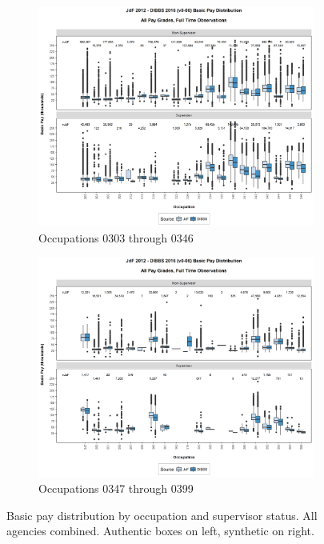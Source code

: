 \documentclass[10pt, letterpaper]{article}
\begin{document}
\begin{spacing}{1.0}
\clearpage

\begin{figure}[h]
    \centering
    \begin{subfigure}{1\textwidth}
        \centering
        \includegraphics[width=6in, trim={0 1in 0 0.75in}, clip]{JdFDIBBSBasicPaySupervisoryStatusOccupation81.png}
        \caption{Occupations 0303 through 0346}
        \vspace{10pt}
    \end{subfigure}
    \begin{subfigure}{1\textwidth}
        \centering
        \includegraphics[width=6in, trim={0 1in 0 0.75in}, clip]{JdFDIBBSBasicPaySupervisoryStatusOccupation101.png}
        \caption{Occupations 0347 through 0399}
        \vspace{10pt}
    \end{subfigure}
    \caption{Basic pay distribution by occupation and supervisor status.  All agencies combined.  Authentic boxes on left, synthetic on right.}
    \label{figure:JdFDIBBSBasicPaySupervisoryStatusOccupation3}
\end{figure}


\end{spacing}
\end{document}
